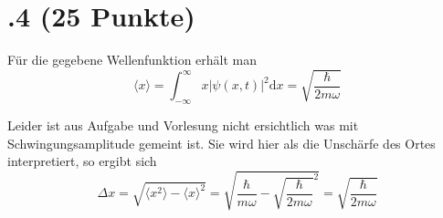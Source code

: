 \section*{\nr.4 \titfour (25 Punkte)}
Für die gegebene Wellenfunktion erhält man 
\begin{equation}
  \langle x \rangle = \int_{-\infty}^{\infty}x|\psi(x,t)|^2\mathrm{d}x=\sqrt{\frac{\hbar}{2m\omega}}
\end{equation}

Leider ist aus Aufgabe und Vorlesung nicht ersichtlich was mit Schwingungsamplitude gemeint ist. Sie wird hier als die Unschärfe des Ortes interpretiert, so ergibt sich
\begin{equation}
  \Delta x = \sqrt{\langle x^2 \rangle - \langle x \rangle^2}=\sqrt{\frac{\hbar}{m\omega}-\sqrt{\frac{\hbar}{2m\omega}}^2}=\sqrt{\frac{\hbar}{2m\omega}}
\end{equation}

